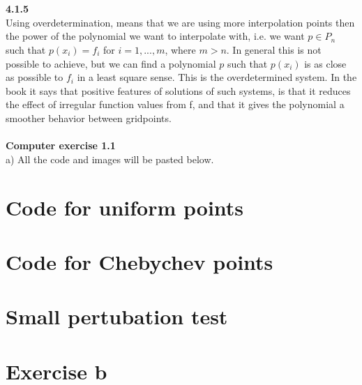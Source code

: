 \documentclass[11pt,a4paper]{report}
\begin{document}
\\
\\
\textbf{4.1.5}
\\
Using overdetermination, means that we are using more interpolation points then the power of the polynomial we want to interpolate with, i.e. we want $p \in P_n$ such that $p(x_i)=f_i$ for $i=1,...,m$, where $m>n$. In general this is not possible to achieve, but we can find a polynomial $p$ such that $p(x_i)$ is as close as possible to $f_i$ in a least square sense. This is the overdetermined system. In the book it says that positive features of solutions of such systems, is that it reduces the effect of irregular function values from f, and that it gives the polynomial a smoother behavior between gridpoints.
\\
\\   
\textbf{Computer exercise 1.1}
\\
a) All the code and images will be pasted below.





\section*{Code for uniform points}


\section*{Code for Chebychev points}

\section*{Small pertubation test}

\section*{Exercise b}

\end{document}
